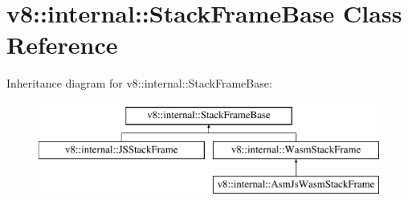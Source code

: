 \hypertarget{classv8_1_1internal_1_1StackFrameBase}{}\section{v8\+:\+:internal\+:\+:Stack\+Frame\+Base Class Reference}
\label{classv8_1_1internal_1_1StackFrameBase}
Inheritance diagram for v8\+:\+:internal\+:\+:Stack\+Frame\+Base\+:\begin{figure}[H]
\begin{center}
\leavevmode
\includegraphics[height=3.000000cm]{classv8_1_1internal_1_1StackFrameBase}
\end{center}
\end{figure}
